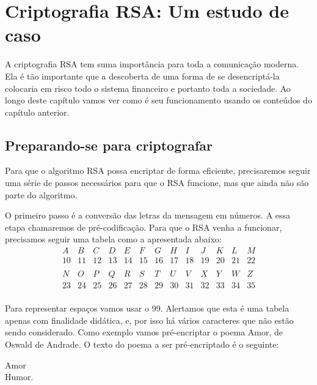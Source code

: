 \pagestyle{fancy}
\fancyhead[R]{\thepage}
\fancyfoot[C]{}
\chapter {Criptografia RSA: Um estudo de caso}
\label{RSA}

A criptografia RSA tem suma import\^ancia para toda a comunica\c{c}\~ao moderna. Ela \'e t\~ao importante que a descoberta de uma forma de se desencript\'a-la colocaria em risco todo o sistema financeiro e portanto toda a sociedade. Ao longo deste cap\'itulo vamos ver como \'e seu funcionamento usando os conte\'udos do cap\'itulo anterior.

\section{Preparando-se para criptografar}

Para que o algoritmo RSA possa encriptar de forma eficiente, precisaremos seguir uma s\'erie de passos necess\'arios para que o RSA funcione, mas que ainda n\~ao s\~ao parte do algoritmo.

O primeiro passo \'e a convers\~ao das letras da mensagem em n\'umeros. A essa etapa chamaremos de pr\'e-codifica\c{c}\~ao. Para que o RSA venha a funcionar, precisamos seguir uma tabela como a apresentada abaixo:
\[
\begin{array}{ccccccccccccc}
A & B & C & D & E & F & G & H & I & J  &  K  & L  & M  \\ 
10 & 11 & 12 & 13 & 14 & 15 & 16 & 17 & 18 & 19 &  20 & 21 & 22 \\ 
\\
N & O  & P  & Q  & R  & S & T  & U  & V  & X  & Y  & W  & Z \\
23 & 24 & 25 & 26 & 27 & 28 & 29 & 30 & 31 & 32 & 33 & 34 & 35 \\
\end{array}
\]

Para representar espa\c{c}os vamos usar o 99. Alertamos que esta \'e uma tabela apenas com finalidade did\'atica, e, por isso h\'a v\'arios caracteres que não estão sendo considerado. Como exemplo vamos pr\'e-encriptar o poema Amor, de Oswald de Andrade. O texto do poema a ser pr\'e-encriptado \'e o seguinte:

\begin{center}
Amor  \\ 
Humor. \\ 
\end{center}

